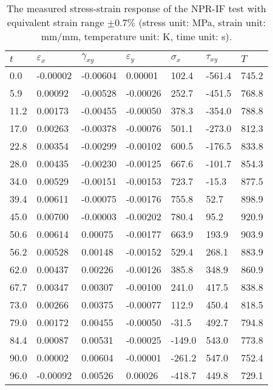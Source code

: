 \begin{table}[htbp]
  \centering
  \caption{The measured stress-strain response of the NPR-IF test with equivalent strain range $\pm0.7\%$ (stress unit: MPa, strain unit: mm/mm, temperature unit: K, time unit: s).}
    \begin{tabular}{p{1.5cm}p{1.5cm}p{1.5cm}p{1.5cm}p{1.5cm}p{1.5cm}p{1.5cm}}
    \toprule
    $t$   & $\varepsilon_x$ & $\gamma_{xy}$ & $\varepsilon_y$ & $\sigma_x$ & $\tau_{xy}$ & $T$ \\
    \midrule
    0.0   & -0.00002  & -0.00604  & 0.00001  & 102.4  & -561.4  & 745.2  \\
    5.9   & 0.00092  & -0.00528  & -0.00026  & 252.7  & -451.5  & 768.8  \\
    11.2  & 0.00173  & -0.00455  & -0.00050  & 378.3  & -354.0  & 788.8  \\
    17.0  & 0.00263  & -0.00378  & -0.00076  & 501.1  & -273.0  & 812.3  \\
    22.8  & 0.00354  & -0.00299  & -0.00102  & 600.5  & -176.5  & 833.8  \\
    28.0  & 0.00435  & -0.00230  & -0.00125  & 667.6  & -101.7  & 854.3  \\
    34.0  & 0.00529  & -0.00151  & -0.00153  & 723.7  & -15.3  & 877.5  \\
    39.4  & 0.00611  & -0.00075  & -0.00176  & 755.8  & 52.7  & 898.9  \\
    45.0  & 0.00700  & -0.00003  & -0.00202  & 780.4  & 95.2  & 920.9  \\
    50.6  & 0.00614  & 0.00075  & -0.00177  & 663.9  & 193.9  & 903.9  \\
    56.2  & 0.00528  & 0.00148  & -0.00152  & 529.4  & 268.1  & 883.9  \\
    62.0  & 0.00437  & 0.00226  & -0.00126  & 385.8  & 348.9  & 860.9  \\
    67.7  & 0.00347  & 0.00307  & -0.00100  & 241.0  & 417.5  & 838.8  \\
    73.0  & 0.00266  & 0.00375  & -0.00077  & 112.9  & 450.4  & 818.5  \\
    79.0  & 0.00172  & 0.00455  & -0.00050  & -31.5  & 492.7  & 794.8  \\
    84.4  & 0.00087  & 0.00531  & -0.00025  & -149.0  & 543.0  & 773.8  \\
    90.0  & 0.00002  & 0.00604  & -0.00001  & -261.2  & 547.0  & 752.4  \\
    96.0  & -0.00092  & 0.00526  & 0.00026  & -418.7  & 449.8  & 729.1  \\

\end{tabular}
\end{table}
